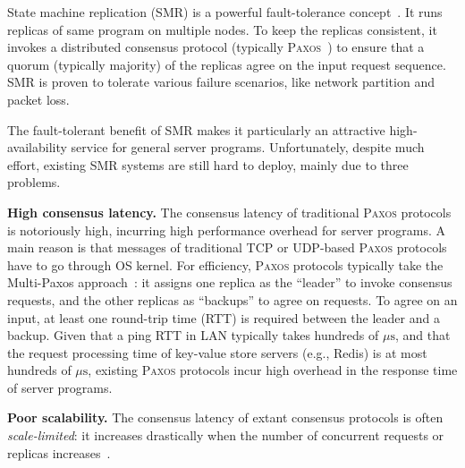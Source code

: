 \documentclass[10pt,onecolumn,letterpaper]{article}
\newcommand{\paxos}[0]{\textsc{Paxos}\xspace}
\newcommand{\smr}[0]{SMR\xspace}
\newcommand{\redis}[0]{{Redis}\xspace}
\newcommand{\eg}{{e.g.}}
\newcommand{\us}[0]{\(\mu\text{s}\)\xspace}
\begin{document}
\begin{sloppypar}
State machine replication (\smr) is a powerful fault-tolerance 
concept~\cite{paxos:practical}. It runs replicas 
of same program on multiple nodes. To keep the replicas consistent, it invokes a 
distributed consensus protocol (typically 
\paxos~\cite{paxos:simple,lamport98parttime,paxos:complex}) to ensure that a 
quorum (typically majority) of the replicas agree on the input request sequence. 
\smr is proven to tolerate various failure scenarios, like network 
partition and packet loss.

The fault-tolerant benefit of \smr makes it particularly an attractive 
high-availability service for general server programs. Unfortunately, despite 
much effort, existing \smr systems are still hard to deploy, mainly due to 
three problems.

\textbf{High consensus latency.} The consensus latency of traditional \paxos 
protocols is notoriously high, incurring high performance overhead for server 
programs. A main reason is that messages of traditional TCP or UDP-based \paxos 
protocols have to go through OS kernel. For efficiency, \paxos protocols 
typically take the Multi-Paxos approach~\cite{paxos:simple}: it assigns one 
replica as the ``leader'' to invoke consensus requests, and the other replicas 
as ``backups'' to agree on requests. To agree on an input, at least one 
round-trip time (RTT) is required between the leader and a backup. Given that a 
ping RTT in LAN typically takes hundreds of \us, and that the request processing 
time of key-value store servers (\eg, \redis) is at most hundreds of \us, 
existing \paxos protocols incur high overhead in the response time of server 
programs.

\textbf{Poor scalability.} The consensus latency of extant consensus protocols 
is often \emph{scale-limited}: it increases drastically when the number of 
concurrent requests or replicas 
increases~\cite{zookeeper,glendenning2011scalable}.


\end{sloppypar}
\end{document}

